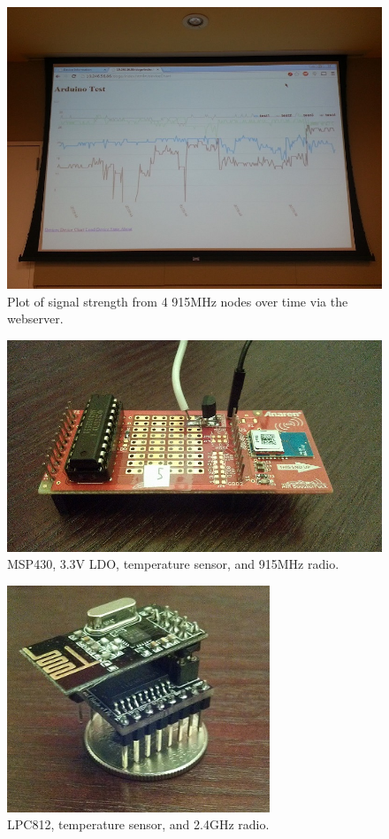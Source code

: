 \documentclass[a4paper]{article}
\begin{document}
\begin{figure}
\centering
\includegraphics[width=1.0\textwidth]{demo_log.jpg}
\caption{\label{fig:demoLog}Plot of signal strength from 4 915MHz nodes over time via the webserver.}
\end{figure}


\begin{figure}
\centering
\includegraphics[width=1.0\textwidth]{boosterpack_node.jpg}
\caption{\label{fig:boosterpackNode}MSP430, 3.3V LDO, temperature sensor, and 915MHz radio.}
\end{figure}

\begin{figure}
\centering
\includegraphics[width=0.7\textwidth]{leaf_node.jpg}
\caption{\label{fig:leafNode}LPC812, temperature sensor, and 2.4GHz radio.}
\end{figure}
\end{document}
